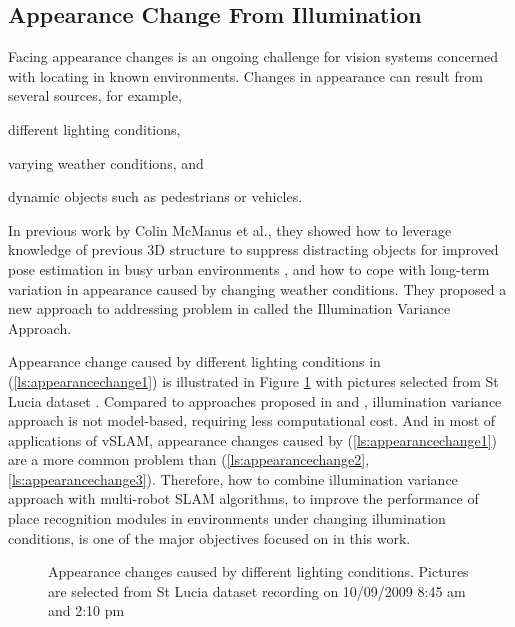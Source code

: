 \subsection{Appearance Change From Illumination}

Facing appearance changes is an ongoing challenge for vision systems concerned with locating in known environments. Changes in appearance can result from several sources, for example, \begin{inparaenum}[(i)]
	\item different lighting conditions,	
	\label{ls:appearancechange1}
	\item varying weather conditions, and
	\label{ls:appearancechange2}
	\item dynamic objects such as pedestrians or vehicles.
	\label{ls:appearancechange3}
\end{inparaenum}

In previous work by Colin McManus et al., they showed how to leverage knowledge of previous 3D structure to suppress distracting objects for improved pose estimation in busy urban environments \cite{mcmanus2013distraction}, and how to cope with long-term variation in appearance caused by changing weather conditions\cite{churchill2012practice}. They proposed a new approach to addressing problem in \cite{maddern2014illumination} called the Illumination Variance Approach. 

Appearance change caused by different lighting conditions in (\ref{ls:appearancechange1}) is illustrated in Figure \ref{fig:shadecompare1} with pictures selected from St Lucia dataset \cite{glover2010fab}. Compared to approaches proposed in \cite{mcmanus2013distraction} and \cite{churchill2012practice}, illumination variance approach is not model-based, requiring less computational cost. And in most of applications of vSLAM, appearance changes caused by (\ref{ls:appearancechange1}) are a more common problem than (\ref{ls:appearancechange2}, \ref{ls:appearancechange3}). Therefore, how to combine illumination variance approach with multi-robot SLAM algorithms, to improve the performance of place recognition modules in environments under changing illumination conditions, is one of the major objectives focused on in this work.

\begin{figure}
	\centering
	\caption{Appearance changes caused by different lighting conditions. Pictures are selected from St Lucia dataset recording on 10/09/2009 8:45 am and 2:10 pm}
	\label{fig:shadecompare1}
\end{figure}

